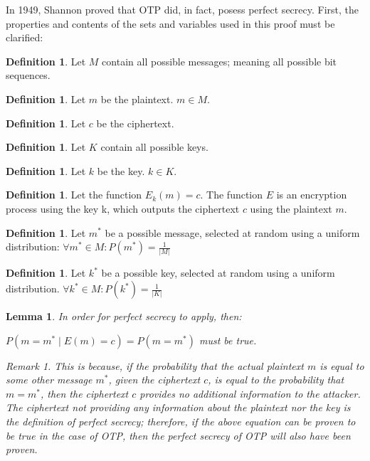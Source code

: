 \documentclass[12pt]{report}
\newtheorem{lemma}[thm]{Lemma}
\theoremstyle{definition}
\newtheorem{defin}[thm]{Definition}
\theoremstyle{remark}
\newtheorem{rem}[thm]{Remark}
\begin{document}
In 1949, Shannon proved that OTP did, in fact, posess perfect secrecy\cite{ShannonOTP}. First, the properties and contents of the sets and variables used in this proof must be clarified:

\begin{defin}
Let $M$ contain all possible messages; meaning all possible bit sequences.
\end{defin}

\begin{defin}
Let $m$ be the plaintext. $m \in M$.
\end{defin}

\begin{defin}
Let $c$ be the ciphertext.
\end{defin}

\begin{defin}
Let $K$ contain all possible keys.
\end{defin}

\begin{defin}
Let $k$ be the key. $k \in K$.
\end{defin}

\begin{defin}
Let the function ${E_k}(m)=c$. The function $E$ is an encryption process using the key k, which outputs the ciphertext $c$ using the plaintext $m$.
\end{defin}

\begin{defin}
Let $m^{*}$ be a possible message, selected at random using a uniform distribution:
$\forall m^{*} \in M: P(m^{*})=\frac{1}{\lvert M \rvert}$
\end{defin}

\begin{defin}
Let $k^{*}$ be a possible key, selected at random using a uniform distribution.
$\forall k^{*} \in M: P(k^{*})=\frac{1}{\lvert K \rvert}$
\end{defin}

\begin{lemma}
In order for perfect secrecy to apply, then:

$P( m=m^{*} \mid E(m)=c ) = P( m=m^{*} )$
must be true.

\begin{rem}
This is because, if the probability that the actual plaintext $m$ is equal to some other message $m^{*}$, given the ciphertext $c$, is equal to the probability that $m=m^{*}$, then the ciphertext $c$ provides no additional information to the attacker. The ciphertext not providing any information about the plaintext nor the key is the definition of perfect secrecy; therefore, if the above equation can be proven to be true in the case of OTP, then the perfect secrecy of OTP will also have been proven.
\end{rem}
\end{lemma}
\end{document}
